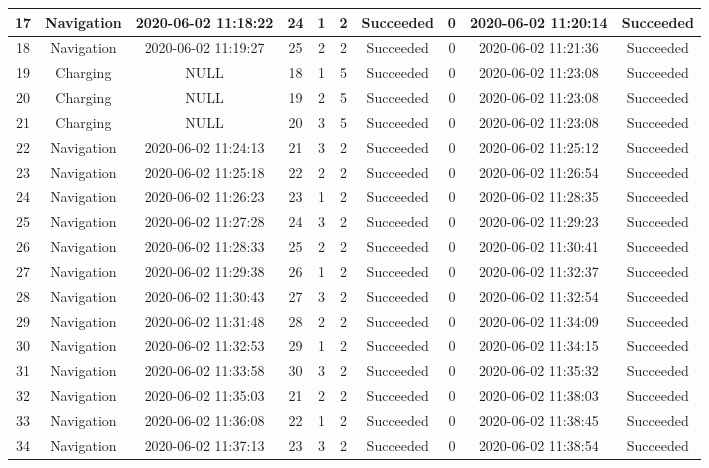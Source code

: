 \begin{table}
{\begin{tabular}{|c|c|c|c|c|c|c|c|c|c|}
17 & Navigation & 2020-06-02 11:18:22 & 24 & 1 & 2 & Succeeded & 0 & 2020-06-02 11:20:14 & Succeeded \\ \hline
18 & Navigation & 2020-06-02 11:19:27 & 25 & 2 & 2 & Succeeded & 0 & 2020-06-02 11:21:36 & Succeeded \\ \hline
19 & Charging & NULL & 18 & 1 & 5 & Succeeded & 0 & 2020-06-02 11:23:08 & Succeeded \\ \hline
20 & Charging & NULL & 19 & 2 & 5 & Succeeded & 0 & 2020-06-02 11:23:08 & Succeeded \\ \hline
21 & Charging & NULL & 20 & 3 & 5 & Succeeded & 0 & 2020-06-02 11:23:08 & Succeeded \\ \hline
22 & Navigation & 2020-06-02 11:24:13 & 21 & 3 & 2 & Succeeded & 0 & 2020-06-02 11:25:12 & Succeeded \\ \hline
23 & Navigation & 2020-06-02 11:25:18 & 22 & 2 & 2 & Succeeded & 0 & 2020-06-02 11:26:54 & Succeeded \\ \hline
24 & Navigation & 2020-06-02 11:26:23 & 23 & 1 & 2 & Succeeded & 0 & 2020-06-02 11:28:35 & Succeeded \\ \hline
25 & Navigation & 2020-06-02 11:27:28 & 24 & 3 & 2 & Succeeded & 0 & 2020-06-02 11:29:23 & Succeeded \\ \hline
26 & Navigation & 2020-06-02 11:28:33 & 25 & 2 & 2 & Succeeded & 0 & 2020-06-02 11:30:41 & Succeeded \\ \hline
27 & Navigation & 2020-06-02 11:29:38 & 26 & 1 & 2 & Succeeded & 0 & 2020-06-02 11:32:37 & Succeeded \\ \hline
28 & Navigation & 2020-06-02 11:30:43 & 27 & 3 & 2 & Succeeded & 0 & 2020-06-02 11:32:54 & Succeeded \\ \hline
29 & Navigation & 2020-06-02 11:31:48 & 28 & 2 & 2 & Succeeded & 0 & 2020-06-02 11:34:09 & Succeeded \\ \hline
30 & Navigation & 2020-06-02 11:32:53 & 29 & 1 & 2 & Succeeded & 0 & 2020-06-02 11:34:15 & Succeeded \\ \hline
31 & Navigation & 2020-06-02 11:33:58 & 30 & 3 & 2 & Succeeded & 0 & 2020-06-02 11:35:32 & Succeeded \\ \hline
32 & Navigation & 2020-06-02 11:35:03 & 21 & 2 & 2 & Succeeded & 0 & 2020-06-02 11:38:03 & Succeeded \\ \hline
33 & Navigation & 2020-06-02 11:36:08 & 22 & 1 & 2 & Succeeded & 0 & 2020-06-02 11:38:45 & Succeeded \\ \hline
34 & Navigation & 2020-06-02 11:37:13 & 23 & 3 & 2 & Succeeded & 0 & 2020-06-02 11:38:54 & Succeeded \\ \hline

\end{tabular}}
\end{table}
